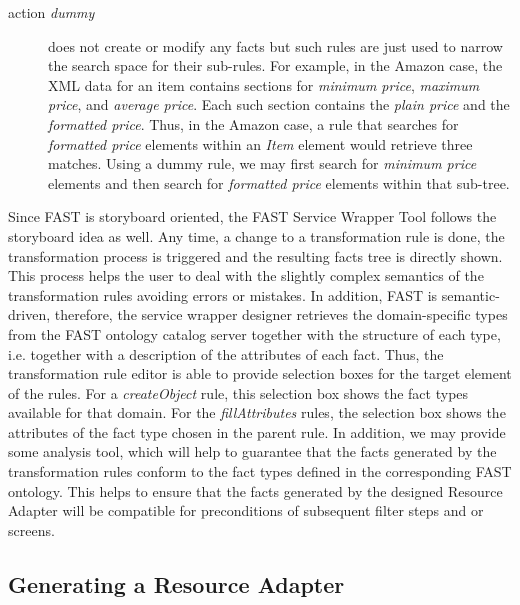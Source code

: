 \documentclass{article}
\begin{document}
\begin{description}
	\item[action \emph{dummy}] does not create or modify any facts but such rules are just used to narrow the search space for their sub-rules. For example, in the Amazon case, the XML data for an item contains sections for \emph{minimum price}, \emph{maximum price}, and \emph{average price}. Each such section contains the \emph{plain price} and the \emph{formatted price}. Thus, in the Amazon case, a rule that searches for \emph{formatted price} elements within an \emph{Item} element would retrieve three matches. Using a dummy rule, we may first search for \emph{minimum price} elements and then search for \emph{formatted price} elements within that sub-tree.
\end{description}

Since FAST is storyboard oriented, the FAST Service Wrapper Tool follows the storyboard idea as well. Any time, a change to a transformation rule is done, the transformation process is triggered and the resulting facts tree is directly shown. This process helps the user to deal with the slightly complex semantics of the transformation rules avoiding errors or mistakes. In addition, FAST is semantic-driven, therefore, the service wrapper designer retrieves the domain-specific types from the FAST ontology catalog server together with the structure of each type, i.e. together with a description of the attributes of each fact. Thus, the transformation rule editor is able to provide selection boxes for the target element of the rules. For a \emph{createObject} rule, this selection box shows the fact types available for that domain. For the \emph{fillAttributes} rules, the selection box shows the attributes of the fact type chosen in the parent rule. In addition, we may provide some analysis tool, which will help to guarantee that the facts generated by the transformation rules conform to the fact types defined in the corresponding FAST ontology. This helps to ensure that the facts generated by the designed Resource Adapter will be compatible for preconditions of subsequent filter steps and or screens.



\subsection{Generating a Resource Adapter} %
\label{sub:generating_a_resource_adapter}
\end{document}

